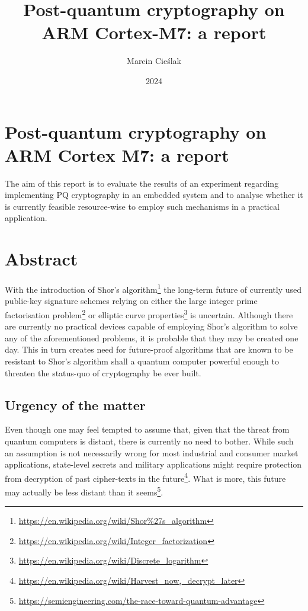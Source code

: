 \documentclass[
]{article}
\author{Marcin Cieślak}
\date{2024}
\title{Post-quantum cryptography on ARM Cortex-M7: a report}
\begin{document}
\hypertarget{title}{%
\section{Post-quantum cryptography on ARM Cortex M7: a report}
\label{title}}

The aim of this report is to evaluate the results of an experiment regarding implementing PQ cryptography
in an embedded system and to analyse whether it is currently feasible resource-wise to employ such mechanisms in a practical application.

\hypertarget{abstract}{%
\section{Abstract}
\label{abstract}}

With the introduction of Shor's algorithm\footnote{\url{https://en.wikipedia.org/wiki/Shor\%27s_algorithm}}
the long-term future of currently used public-key signature schemes relying on either the large integer prime factorisation problem\footnote{\url{https://en.wikipedia.org/wiki/Integer_factorization}} or
elliptic curve properties\footnote{\url{https://en.wikipedia.org/wiki/Discrete_logarithm}} is uncertain.
Although there are currently no practical devices capable of employing
Shor's algorithm to solve any of the aforementioned problems, it is probable that they may be created one day.
This in turn creates need for future-proof algorithms that are known to be resistant to Shor's algorithm shall a quantum computer powerful enough to threaten the status-quo of cryptography be ever built.

\hypertarget{urgency}{%
\subsection{Urgency of the matter}\label{urgency}}

Even though one may feel tempted to assume that, given that the threat from quantum computers is distant,
there is currently no need to bother. While such an assumption is not necessarily wrong for most
industrial and consumer market applications, state-level secrets and military applications might require
protection from decryption of past cipher-texts in the future\footnote{\url{https://en.wikipedia.org/wiki/Harvest_now,_decrypt_later}}.
What is more, this future may actually be less distant than it seems\footnote{\url{https://semiengineering.com/the-race-toward-quantum-advantage}}.
\end{document}
